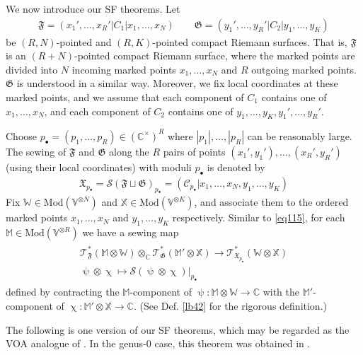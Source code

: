 \documentclass[11pt,b5paper,notitlepage]{article}
\theoremstyle{definition}
\theoremstyle{plain}
\newcommand{\blt}{\bullet}
\newcommand{\Vbb}{\mathbb V}
\newcommand{\Xbb}{\mathbb X}
\newcommand{\Wbb}{\mathbb W}
\newcommand{\Mbb}{\mathbb M}
\newcommand{\Cbb}{\mathbb C}
\newcommand{\<}{\left\langle}
\renewcommand{\>}{\right\rangle}
\newcommand{\MC}{\mathcal{C}}
\newcommand{\fx}{\mathfrak{X}}
\newcommand{\ST}{\mathscr{T}}
\newcommand{\MS}{\mathcal{S}}
\newcommand{\Mod}{\mathrm{Mod}}
\newcommand{\ff}{\mathfrak{F}}
\newcommand{\fg}{\mathfrak{G}}
\numberwithin{equation}{section}
\begin{document}
We now introduce our SF theorems. Let
\begin{gather}\label{eq122}
\ff=(x_1',\dots,x_R'|C_1|x_1,\dots,x_N)\qquad \fg=(y_1',\dots,y_R'|C_2|y_1,\dots,y_K)
\end{gather}
be $(R,N)$-pointed and $(R,K)$-pointed compact Riemann surfaces. That is, $\ff$ is an $(R+N)$-pointed compact Riemann surface, where the marked points are divided into $N$ incoming marked points $x_1,\dots,x_N$ and $R$ outgoing marked points. $\fg$ is understood in a similar way. Moreover, we fix local coordinates at these marked points, and we assume that each component of $C_1$ contains one of $x_1,\dots,x_N$, and each component of $C_2$ contains one of $y_1,\dots,y_K,y_1',\dots,y_R'$. 


Choose $p_\blt=(p_1,\dots,p_R)\in(\Cbb^\times)^R$ where $|p_1|,\dots,|p_R|$ can be reasonably large. The sewing of $\ff$ and $\fg$ along the $R$ pairs of points $(x_1',y_1'),\dots,(x_R',y_R')$ (using their local coordinates) with moduli $p_\blt$ is denoted by
\begin{align*}
\fx_{p_\blt}=\MS(\ff\sqcup\fg)_{p_\blt}=(\MC_{p_\blt}|x_1,\dots,x_N,y_1,\dots,y_K)
\end{align*}
Fix $\Wbb\in\Mod(\Vbb^{\otimes N})$ and $\Xbb\in\Mod(\Vbb^{\otimes K})$, and associate them to the ordered marked points $x_1,\dots,x_N$ and $y_1,\dots,y_K$ respectively. Similar to \eqref{eq115}, for each $\Mbb\in\Mod(\Vbb^{\otimes R})$ we have a sewing map
\begin{gather}\label{eq118}
\begin{gathered}
\ST^*_\ff(\Mbb\otimes\Wbb)\otimes_\Cbb\ST^*_\fg(\Mbb'\otimes\Xbb)\longrightarrow \ST^*_{\fx_{p_\blt}}(\Wbb\otimes\Xbb)\\
\uppsi\otimes\upchi\mapsto \MS(\uppsi\otimes\upchi)\big|_{p_\blt}
\end{gathered}
\end{gather}
defined by contracting the $\Mbb$-component of $\uppsi:\Mbb\otimes\Wbb\rightarrow\Cbb$ with the $\Mbb'$-component of $\upchi:\Mbb'\otimes\Xbb\rightarrow\Cbb$. (See Def. \ref{lb42} for the rigorous definition.) 

The following is one version of our SF theorems, which may be regarded as the VOA analogue of \cite[Cor. 4.9]{HR24-MF}. In the genus-$0$ case, this theorem was obtained in \cite{Moriwaki22-CB}.
\end{document}
